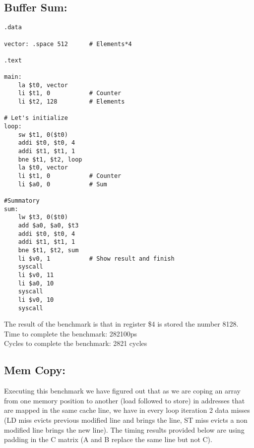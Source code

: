 \documentclass{article}
\begin{document}
\subsection{Buffer Sum:}
\vspace{5pt}
\begin{lstlisting} 
.data

vector: .space 512      # Elements*4

.text

main:
	la $t0, vector
	li $t1, 0           # Counter
	li $t2, 128         # Elements

# Let's initialize
loop:
	sw $t1, 0($t0)
	addi $t0, $t0, 4
	addi $t1, $t1, 1
	bne $t1, $t2, loop
    la $t0, vector
	li $t1, 0           # Counter
	li $a0, 0           # Sum

#Summatory
sum:
	lw $t3, 0($t0)
	add $a0, $a0, $t3
	addi $t0, $t0, 4
	addi $t1, $t1, 1
	bne $t1, $t2, sum
	li $v0, 1           # Show result and finish
    syscall
    li $v0, 11
    li $a0, 10
    syscall
	li $v0, 10
	syscall
\end{lstlisting}
The result of the benchmark is that in register \$4 is stored the number 8128.\\
Time to complete the benchmark: 282100ps\\
Cycles to complete the benchmark: 2821 cycles

\subsection{Mem Copy:}
\vspace{5pt}

Executing this benchmark we have figured out that as we are coping an array from one memory position to another (load followed to store) in addresses that are mapped in the same cache line, we have in every loop iteration 2 data misses (LD miss evicts previous modified line and brings the line, ST miss evicts a non modified line brings the new line). The timing results provided below are using padding in the C matrix (A and B replace the same line but not C).
\end{document}
